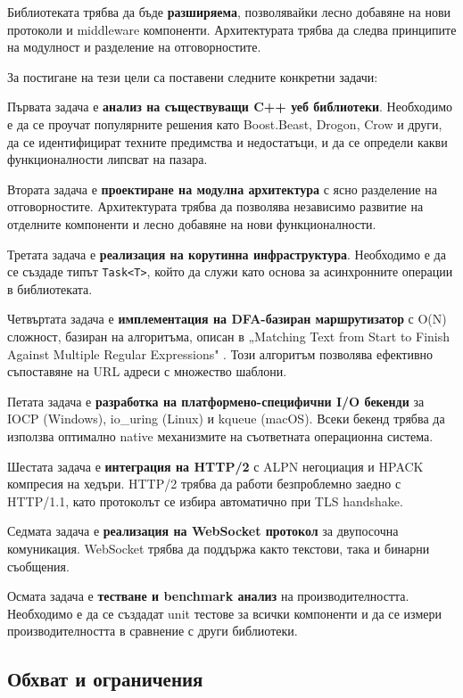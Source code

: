 Библиотеката трябва да бъде \textbf{разширяема}, позволявайки лесно добавяне на нови протоколи и middleware компоненти. Архитектурата трябва да следва принципите на модулност и разделение на отговорностите.

За постигане на тези цели са поставени следните конкретни задачи:

Първата задача е \textbf{анализ на съществуващи C++ уеб библиотеки}. Необходимо е да се проучат популярните решения като Boost.Beast, Drogon, Crow и други, да се идентифицират техните предимства и недостатъци, и да се определи какви функционалности липсват на пазара.

Втората задача е \textbf{проектиране на модулна архитектура} с ясно разделение на отговорностите. Архитектурата трябва да позволява независимо развитие на отделните компоненти и лесно добавяне на нови функционалности.

Третата задача е \textbf{реализация на корутинна инфраструктура}. Необходимо е да се създаде типът \texttt{Task<T>}, който да служи като основа за асинхронните операции в библиотеката.

Четвъртата задача е \textbf{имплементация на DFA-базиран маршрутизатор} с O(N) сложност, базиран на алгоритъма, описан в „Matching Text from Start to Finish Against Multiple Regular Expressions" \cite{stankov2024regex}. Този алгоритъм позволява ефективно съпоставяне на URL адреси с множество шаблони.

Петата задача е \textbf{разработка на платформено-специфични I/O бекенди} за IOCP (Windows), io\_uring (Linux) и kqueue (macOS). Всеки бекенд трябва да използва оптимално native механизмите на съответната операционна система.

Шестата задача е \textbf{интеграция на HTTP/2} с ALPN негоциация и HPACK компресия на хедъри. HTTP/2 трябва да работи безпроблемно заедно с HTTP/1.1, като протоколът се избира автоматично при TLS handshake.

Седмата задача е \textbf{реализация на WebSocket протокол} за двупосочна комуникация. WebSocket трябва да поддържа както текстови, така и бинарни съобщения.

Осмата задача е \textbf{тестване и benchmark анализ} на производителността. Необходимо е да се създадат unit тестове за всички компоненти и да се измери производителността в сравнение с други библиотеки.

\subsection{Обхват и ограничения}

